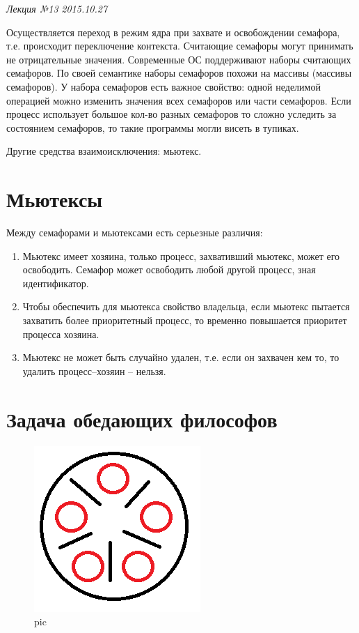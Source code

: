 \clearpage
\begin{flushright}
	\textit{Лекция №13}
	\textit{2015.10.27}
\end{flushright}


Осуществляется переход в режим ядра при захвате и освобождении семафора, т.е. происходит переключение контекста.
Считающие семафоры могут принимать не отрицательные значения. Современные ОС поддерживают наборы считающих семафоров. По своей семантике наборы семафоров похожи на массивы (массивы семафоров). У набора семафоров есть важное свойство: одной неделимой операцией можно изменить значения всех семафоров или части семафоров.
Если процесс использует большое кол-во разных семафоров то сложно уследить за состоянием семафоров, то такие программы могли висеть в тупиках.

Другие средства взаимоисключения: мьютекс.

\section{Мьютексы}

Между семафорами и мьютексами есть серьезные различия:
\begin{enumerate}
    \item Мьютекс имеет хозяина, только процесс, захвативший мьютекс, может его освободить. Семафор может освободить любой другой процесс, зная идентификатор.
    \item Чтобы обеспечить для мьютекса свойство владельца, если мьютекс пытается захватить более приоритетный процесс, то временно повышается приоритет процесса хозяина.
    \item Мьютекс не может быть случайно удален, т.е. если он захвачен кем то, то удалить процесс–хозяин – нельзя. 
\end{enumerate} 

\section{Задача обедающих философов}

\begin{figure}[H]
    \centering
    \includegraphics{pic/1.png}
    \caption{pic}
\end{figure}

